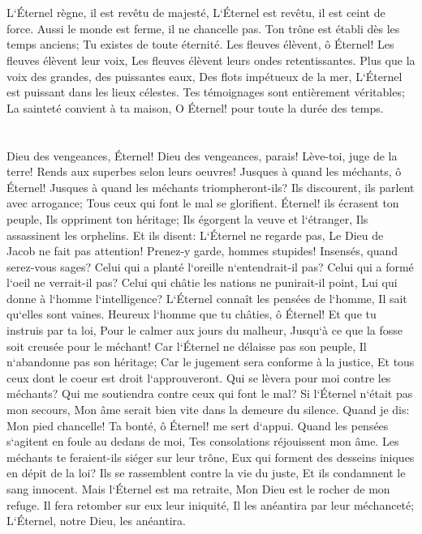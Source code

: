 \chapter{}

\verse L`Éternel règne, il est revêtu de majesté, L`Éternel est revêtu, il est ceint de force. Aussi le monde est ferme, il ne chancelle pas. 
\verse Ton trône est établi dès les temps anciens; Tu existes de toute éternité. 
\verse Les fleuves élèvent, ô Éternel! Les fleuves élèvent leur voix, Les fleuves élèvent leurs ondes retentissantes. 
\verse Plus que la voix des grandes, des puissantes eaux, Des flots impétueux de la mer, L`Éternel est puissant dans les lieux célestes. 
\verse Tes témoignages sont entièrement véritables; La sainteté convient à ta maison, O Éternel! pour toute la durée des temps. 

\chapter{}

\verse Dieu des vengeances, Éternel! Dieu des vengeances, parais! 
\verse Lève-toi, juge de la terre! Rends aux superbes selon leurs oeuvres! 
\verse Jusques à quand les méchants, ô Éternel! Jusques à quand les méchants triompheront-ils? 
\verse Ils discourent, ils parlent avec arrogance; Tous ceux qui font le mal se glorifient. 
\verse Éternel! ils écrasent ton peuple, Ils oppriment ton héritage; 
\verse Ils égorgent la veuve et l`étranger, Ils assassinent les orphelins. 
\verse Et ils disent: L`Éternel ne regarde pas, Le Dieu de Jacob ne fait pas attention! 
\verse Prenez-y garde, hommes stupides! Insensés, quand serez-vous sages? 
\verse Celui qui a planté l`oreille n`entendrait-il pas? Celui qui a formé l`oeil ne verrait-il pas? 
\verse Celui qui châtie les nations ne punirait-il point, Lui qui donne à l`homme l`intelligence? 
\verse L`Éternel connaît les pensées de l`homme, Il sait qu`elles sont vaines. 
\verse Heureux l`homme que tu châties, ô Éternel! Et que tu instruis par ta loi, 
\verse Pour le calmer aux jours du malheur, Jusqu`à ce que la fosse soit creusée pour le méchant! 
\verse Car l`Éternel ne délaisse pas son peuple, Il n`abandonne pas son héritage; 
\verse Car le jugement sera conforme à la justice, Et tous ceux dont le coeur est droit l`approuveront. 
\verse Qui se lèvera pour moi contre les méchants? Qui me soutiendra contre ceux qui font le mal? 
\verse Si l`Éternel n`était pas mon secours, Mon âme serait bien vite dans la demeure du silence. 
\verse Quand je dis: Mon pied chancelle! Ta bonté, ô Éternel! me sert d`appui. 
\verse Quand les pensées s`agitent en foule au dedans de moi, Tes consolations réjouissent mon âme. 
\verse Les méchants te feraient-ils siéger sur leur trône, Eux qui forment des desseins iniques en dépit de la loi? 
\verse Ils se rassemblent contre la vie du juste, Et ils condamnent le sang innocent. 
\verse Mais l`Éternel est ma retraite, Mon Dieu est le rocher de mon refuge. 
\verse Il fera retomber sur eux leur iniquité, Il les anéantira par leur méchanceté; L`Éternel, notre Dieu, les anéantira. 

